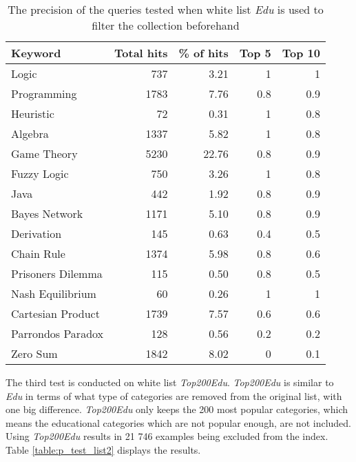 \begin{table}[h]
\centering
\small
\begin{tabular} {|| p{10em} | r | r | r | r ||} 
 \hline
 Keyword & Total hits & \% of hits & Top 5 & Top 10 \\ [0.5ex] 
 \hline

Logic & 737 & 3.21 & 1 & 1 \\
Programming & 1783 & 7.76 & 0.8 & 0.9 \\
Heuristic & 72 & 0.31 & 1 & 0.8 \\
Algebra & 1337 & 5.82 & 1 & 0.8 \\
Game Theory & 5230 & 22.76 & 0.8 & 0.9 \\
\hline
Fuzzy Logic & 750 & 3.26 & 1 & 0.8 \\
Java & 442 & 1.92 & 0.8 & 0.9 \\
Bayes Network & 1171 & 5.10 & 0.8 & 0.9 \\
Derivation & 145 & 0.63 & 0.4 & 0.5 \\
\hline
Chain Rule & 1374 & 5.98 & 0.8 & 0.6 \\
Prisoners Dilemma & 115 & 0.50 & 0.8 & 0.5 \\
Nash Equilibrium & 60 & 0.26 & 1 & 1 \\
Cartesian Product & 1739 & 7.57 & 0.6 & 0.6 \\
Parrondos Paradox & 128 & 0.56 & 0.2 & 0.2 \\
Zero Sum & 1842 & 8.02 & 0 & 0.1 \\

 \hline
\end{tabular}
\caption{The precision of the queries tested when white list \textit{Edu} is used to filter the collection beforehand}
\label{table:p_test_list1}
\end{table}
\clearpage


The third test is conducted on white list \textit{Top200Edu}. \textit{Top200Edu} is similar to \textit{Edu} in terms of what type of categories are removed from the original list, with one big difference. \textit{Top200Edu} only keeps the 200 most popular categories, which means the educational categories which are not popular enough, are not included. Using \textit{Top200Edu} results in 21 746 examples being excluded from the index. Table \ref{table:p_test_list2} displays the results.


